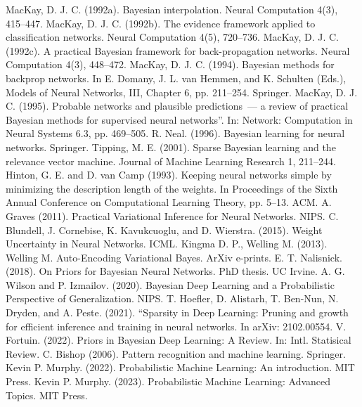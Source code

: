 \documentclass{article}
\numberwithin{equation}{section}
\begin{document}
\begin{thebibliography}{0}
        MacKay, D. J. C. (1992a).
        Bayesian interpolation. Neural Computation 4(3), 415–447.
        MacKay, D. J. C. (1992b).
        The evidence framework applied to classification networks.
        Neural Computation 4(5), 720–736.
        MacKay, D. J. C. (1992c).
        A practical Bayesian framework for back-propagation networks.
        Neural Computation 4(3), 448–472.
        MacKay, D. J. C. (1994).
        Bayesian methods for backprop networks.
        In E. Domany, J. L. van Hemmen, and K. Schulten (Eds.),
        Models of Neural Networks, III, Chapter 6, pp. 211–254.
        Springer.
        MacKay, D. J. C. (1995).
        Probable networks and plausible predictions~---
        a review of practical Bayesian methods for supervised neural networks”.
        In: Network: Computation in Neural Systems 6.3, pp. 469–505.
        R. Neal. (1996).
        Bayesian learning for neural networks.
        Springer.
        Tipping, M. E. (2001).
        Sparse Bayesian learning and the relevance vector machine.
        Journal of Machine Learning Research 1, 211–244.
        Hinton, G. E. and D. van Camp (1993).
        Keeping neural networks simple by minimizing the description length of the weights.
        In Proceedings of the Sixth Annual Conference on Computational Learning Theory, pp. 5–13. ACM.
        A. Graves (2011).
        Practical Variational Inference for Neural Networks.
        NIPS.
        C. Blundell, J. Cornebise, K. Kavukcuoglu, and D. Wierstra. (2015).
        Weight Uncertainty in Neural Networks.
        ICML.
        Kingma D. P., Welling M. (2013).
        Welling M. Auto-Encoding Variational Bayes. ArXiv e-prints.
        E. T. Nalisnick. (2018).
        On Priors for Bayesian Neural Networks.
        PhD thesis. UC Irvine.
        A. G. Wilson and P. Izmailov. (2020).
        Bayesian Deep Learning and a Probabilistic Perspective of Generalization.
        NIPS.
        T. Hoefler, D. Alistarh, T. Ben-Nun, N. Dryden, and A. Peste. (2021).
        “Sparsity in Deep Learning:
        Pruning and growth for efficient inference and training in neural networks.
        In arXiv: 2102.00554.
        V. Fortuin. (2022).
        Priors in Bayesian Deep Learning: A Review.
        In: Intl. Statisical Review.
        C. Bishop (2006).
        Pattern recognition and machine learning.
        Springer.
        Kevin P. Murphy. (2022).
        Probabilistic Machine Learning: An introduction.
        MIT Press.
        Kevin P. Murphy. (2023).
        Probabilistic Machine Learning: Advanced Topics.
        MIT Press.
\end{thebibliography}
\end{document}

